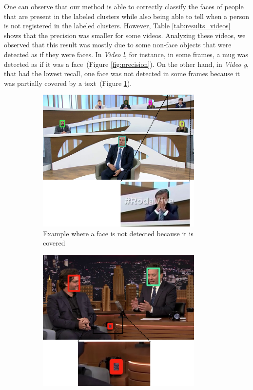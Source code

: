 One can observe that our method is able to correctly classify the faces of people that are present in the labeled clusters while also being able to tell when a person is not registered in the labeled clusters.
However, Table \ref{tab:results_videos} shows that the precision was smaller for some videos. Analyzing these videos, we observed that this result was mostly due to some non-face objects that were detected as if they were faces.
In \emph{Video l}, for instance, in some frames, a mug was detected as if it was a face~(Figure \ref{fig:precision}). 
On the other hand, in \emph{Video g}, that had the lowest recall, one face was not detected in some frames because it was partially covered by a text~(Figure \ref{fig:recall}).

\begin{figure}[!ht]
\centering
    \begin{subfigure}{0.47\linewidth}
        \centering
        \includegraphics[width=0.9\textwidth]{img/face_recognition/maia2.png}
        \caption{Example where a face is not detected because it is covered}
        \label{fig:recall}
    \end{subfigure}\hfill
    \begin{subfigure}{0.47\linewidth}
        \centering
        \includegraphics[width=0.9\textwidth]{img/face_recognition/wagner2.png}

\end{subfigure}
\end{figure}

